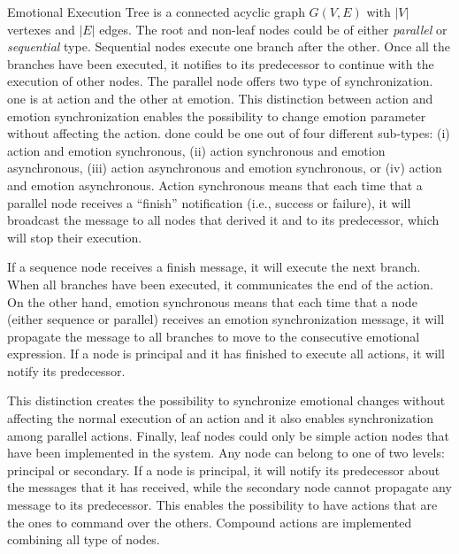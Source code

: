 Emotional Execution Tree is a connected acyclic graph $G(V,E)$ with $|V|$ vertexes and $|E|$ edges. The root and non-leaf nodes could be of either \textit{parallel} or \textit{sequential} type. Sequential nodes execute one branch after the other. Once all the branches have been executed, it notifies to its predecessor to continue with the execution of other nodes.  The parallel node offers two type of synchronization. one is at action and the other at emotion. This distinction between action and emotion synchronization enables the possibility to change emotion parameter without affecting the action. done could be one out of four different sub-types: (i) action and emotion synchronous, (ii) action synchronous and emotion asynchronous, (iii) action asynchronous and emotion synchronous, or (iv) action and emotion asynchronous. 
 Action synchronous means that each time that a parallel node receives a ``finish'' notification (i.e., success or failure), it will broadcast the message to all nodes that derived it and to its predecessor, which will stop their execution. 
 
 If a sequence node receives a finish message, it will execute the next branch. When all branches have been executed, it communicates the end of the action. On the other hand, emotion synchronous means that each time that a node (either sequence or parallel) receives an emotion synchronization message, it will propagate the message to all branches to move to the consecutive emotional expression. If a node is principal and it has finished to execute all actions, it will notify its predecessor. 
 
This distinction creates the possibility to synchronize emotional changes without affecting the normal execution of an action and it also enables synchronization among parallel actions. Finally, leaf nodes could only be simple action nodes that have been implemented in the system. Any node can belong to one of two levels: principal or  secondary. If a node is principal, it will notify its predecessor about the messages that it has received, while the secondary node cannot propagate any message to its predecessor. This enables the possibility to have actions that are the ones to command over the others. 
Compound actions are implemented combining all type of nodes. 